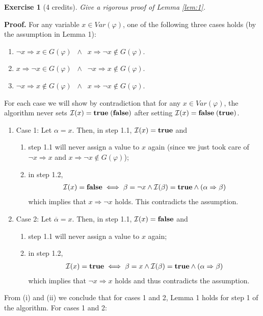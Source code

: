 \documentclass [11pt]{article}
\newtheorem{exercise}{Exercise}
\newcommand{\Ra}{\Rightarrow}
\renewcommand{\phi}{\varphi}
\def\II{{\cal I}}
\newcommand{\True}{\mathbf{true}}
\newcommand{\False}{\mathbf{false}}
\def\ox{\neg x}
\def\oa{\overline{\alpha}}
\def\a{\alpha}
\def\b{\beta}
\renewcommand{\em}{\rm}
\begin{document}
\noindent
\begin{exercise}[4 credits]
{\em Give a rigorous proof of Lemma \ref{lem:1}.
}%
\end{exercise}
\noindent
{\bf Proof.} For any variable $x \in Var(\phi)$, one of the following three cases holds (by the assumption in Lemma 1):
\begin{enumerate}
\item $\ox \Ra x \in G(\phi)\;\;\land\;\; x \Ra \ox \not \in G(\phi)$.
\item $x \Ra \ox \in G(\phi) \;\;\land\;\;  \ox \Ra x \not \in G(\phi)$.
\item $\ox \Ra x \not \in G(\phi)\;\;\land\;\; x \Ra \ox \not \in G(\phi)$.
\end{enumerate}
For each case we will show by contradiction that for any $x \in Var(\phi)$, the algorithm never sets $\II(x) = \True\;(\False)$ after setting $\II(x) = \False\;(\True)$.
\begin{enumerate}[label=(\roman*)]
\item Case 1: Let $\a = x$. Then, in step 1.1, $\II(x) = \True$ and 
\begin{enumerate}[label=\alph*)]
\item step 1.1 will never assign a value to $x$ again (since we just took care of $\ox \Ra x$ and  $x \Ra \ox \not \in G(\phi)$);
\item in step 1.2, 
\begin{align}
\II(x) = \False \iff \b = \ox \land \II(\b) = \True \land (\a \Ra \b)
\end{align}
which implies that $x \Ra \ox$ holds. This contradicts the assumption.
\end{enumerate}
\item Case 2:  Let $\oa = x$. Then, in step 1.1, $\II(x) = \False$ and 
\begin{enumerate}[label=\alph*)]
\item step 1.1 will never assign a value to $x$ again;
\item in step 1.2, 
\begin{align}
\II(x) = \True \iff \b = x \land \II(\b) = \True \land (\a \Ra \b)
\end{align}
which implies that $\ox \Ra x$ holds and thus contradicts the assumption.
\end{enumerate}
\end{enumerate}
From (i) and (ii) we conclude that for cases 1 and 2, Lemma 1 holds for step 1 of the algorithm. For cases 1 and 2:
\end{document}
